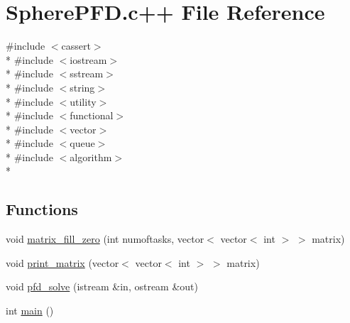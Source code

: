 \hypertarget{SpherePFD_8c_09_09}{\section{Sphere\-P\-F\-D.\-c++ File Reference}
\label{SpherePFD_8c_09_09}
}
{\ttfamily \#include $<$cassert$>$}\\*
{\ttfamily \#include $<$iostream$>$}\\*
{\ttfamily \#include $<$sstream$>$}\\*
{\ttfamily \#include $<$string$>$}\\*
{\ttfamily \#include $<$utility$>$}\\*
{\ttfamily \#include $<$functional$>$}\\*
{\ttfamily \#include $<$vector$>$}\\*
{\ttfamily \#include $<$queue$>$}\\*
{\ttfamily \#include $<$algorithm$>$}\\*
\subsection*{Functions}
\begin{DoxyCompactItemize}
\item 
void \hyperlink{SpherePFD_8c_09_09_a93a8416bcb33dc2e804292bd9690cac1}{matrix\-\_\-fill\-\_\-zero} (int numoftasks, vector$<$ vector$<$ int $>$ $>$ matrix)
\item 
void \hyperlink{SpherePFD_8c_09_09_a204f71bd6be404674c15ed724098518f}{print\-\_\-matrix} (vector$<$ vector$<$ int $>$ $>$ matrix)
\item 
void \hyperlink{SpherePFD_8c_09_09_a6584b134df3d4e68732be7089136c17e}{pfd\-\_\-solve} (istream \&in, ostream \&out)
\item 
int \hyperlink{SpherePFD_8c_09_09_ae66f6b31b5ad750f1fe042a706a4e3d4}{main} ()
\end{DoxyCompactItemize}


